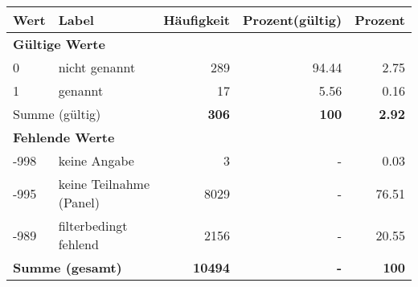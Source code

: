      \begin{longtable}{lXrrr}
     \toprule
     \textbf{Wert} & \textbf{Label} & \textbf{Häufigkeit} & \textbf{Prozent(gültig)} & \textbf{Prozent} \\
     \endhead
     \midrule
     \multicolumn{5}{l}{\textbf{Gültige Werte}}\\

     0 &
     \multicolumn{1}{X}{ nicht genannt   } &


       \num{289} &
       \num[round-mode=places,round-precision=2]{94,44} &
         \num[round-mode=places,round-precision=2]{2,75} \\

     1 &
     \multicolumn{1}{X}{ genannt   } &


       \num{17} &
       \num[round-mode=places,round-precision=2]{5,56} &
         \num[round-mode=places,round-precision=2]{0,16} \\
     \midrule
     \multicolumn{2}{l}{Summe (gültig)} &
       \textbf{\num{306}} &
     \textbf{100} &
       \textbf{\num[round-mode=places,round-precision=2]{2,92}} \\
     \multicolumn{5}{l}{\textbf{Fehlende Werte}}\\
       -998 &
       keine Angabe &
         \num{3} &
        - &
         \num[round-mode=places,round-precision=2]{0,03} \\
       -995 &
       keine Teilnahme (Panel) &
         \num{8029} &
        - &
         \num[round-mode=places,round-precision=2]{76,51} \\
       -989 &
       filterbedingt fehlend &
         \num{2156} &
        - &
         \num[round-mode=places,round-precision=2]{20,55} \\
     \midrule
     \multicolumn{2}{l}{\textbf{Summe (gesamt)}} &
          \textbf{\num{10494}} &
        \textbf{-} &
        \textbf{100} \\
     \bottomrule
     \end{longtable}
     
